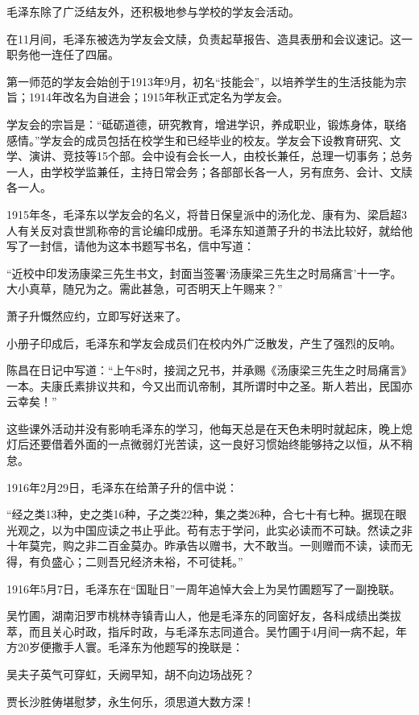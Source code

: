 \documentclass[../../dazhuan.tex]{subfiles}
\begin{document}
毛泽东除了广泛结友外，还积极地参与学校的学友会活动。

在11月间，毛泽东被选为学友会文牍，负责起草报告、造具表册和会议速记。这一职务他一连任了四届。

第一师范的学友会始创于1913年9月，初名“技能会”，以培养学生的生活技能为宗旨；1914年改名为自进会；1915年秋正式定名为学友会。

学友会的宗旨是：“砥砺道德，研究教育，增进学识，养成职业，锻炼身体，联络感情。”学友会的成员包括在校学生和已经毕业的校友。学友会下设教育研究、文学、演讲、竞技等15个部。会中设有会长一人，由校长兼任，总理一切事务；总务一人，由学校学监兼任，主持日常会务；各部部长各一人，另有庶务、会计、文牍各一人。

1915年冬，毛泽东以学友会的名义，将昔日保皇派中的汤化龙、康有为、梁启超3人有关反对袁世凯称帝的言论编印成册。毛泽东知道萧子升的书法比较好，就给他写了一封信，请他为这本书题写书名，信中写道：

“近校中印发汤康梁三先生书文，封面当签署‘汤康梁三先生之时局痛言’十一字。大小真草，随兄为之。需此甚急，可否明天上午赐来？”

萧子升慨然应约，立即写好送来了。

小册子印成后，毛泽东和学友会成员们在校内外广泛散发，产生了强烈的反响。

陈昌在日记中写道：“上午8时，接润之兄书，并承赐《汤康梁三先生之时局痛言》一本。夫康氏素排议共和，今又出而讥帝制，其所谓时中之圣。斯人若出，民国亦云幸矣！”

这些课外活动并没有影响毛泽东的学习，他每天总是在天色未明时就起床，晚上熄灯后还要借着外面的一点微弱灯光苦读，这一良好习惯始终能够持之以恒，从不稍怠。

1916年2月29日，毛泽东在给萧子升的信中说：

“经之类13种，史之类16种，子之类22种，集之类26种，合七十有七种。据现在眼光观之，以为中国应读之书止乎此。苟有志于学问，此实必读而不可缺。然读之非十年莫完，购之非二百金莫办。昨承告以赠书，大不敢当。一则赠而不读，读而无得，有负盛心；二则吾兄经济未裕，不可徒耗。”

1916年5月7日，毛泽东在“国耻日”一周年追悼大会上为吴竹圃题写了一副挽联。

吴竹圃，湖南汨罗市桃林寺镇青山人，他是毛泽东的同窗好友，各科成绩出类拔萃，而且关心时政，指斥时政，与毛泽东志同道合。吴竹圃于4月间一病不起，年方20岁便撒手人寰。毛泽东为他题写的挽联是：

\begin{couplet}
吴夫子英气可穿虹，夭阙早知，胡不向边场战死？

贾长沙胜俦堪慰梦，永生何乐，须思道大数方深！
\end{couplet}
\end{document}
